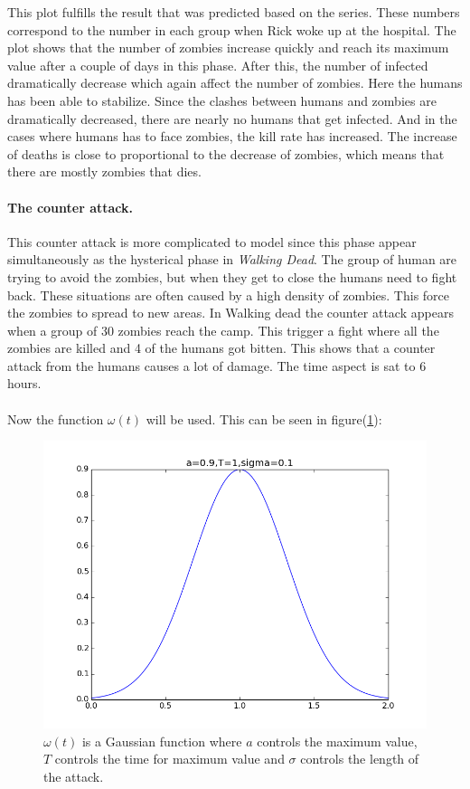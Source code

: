 \documentclass[%
twoside,                 %
final,                   %
10pt]{article}
\begin{document}
This plot fulfills the result that was predicted based on the series. These numbers correspond to the number in each group when Rick woke up at the hospital.  The plot shows that the number of zombies increase quickly and reach its maximum value after a couple of days in this phase. After this, the number of infected dramatically decrease which again affect the number of zombies. Here the humans has been able to stabilize. Since the clashes between humans and zombies are dramatically decreased, there are nearly no humans that get infected. And in the cases where humans has to face zombies, the kill rate has increased. The increase of deaths is close to proportional to the decrease of zombies, which means that there are mostly zombies that dies.

\paragraph{The counter attack.}
This counter attack is more complicated to model since this phase appear simultaneously as the hysterical phase in \emph{Walking Dead}. The group of human are trying to avoid the zombies, but when they get to close the humans need to fight back. These situations are often caused by a high density of zombies. This force the zombies to spread to new areas. In Walking dead the counter attack appears when a group of 30 zombies reach the camp. This trigger a fight where all the zombies are killed and 4 of the humans got bitten. This shows that a counter attack from the humans causes a lot of damage. The time aspect is sat to 6 hours.  
\\
\\
Now the function $\omega(t)$ will be used. This can be seen in figure(\ref{fig:omega_function}):


\begin{figure}[ht]
  \centerline{\includegraphics[width=0.9\linewidth]{plots/omega_function.png}}
  \caption{
  \label{fig:omega_function} $\omega (t)$ is a Gaussian function where $a$ controls the maximum value, $T$ controls the time for maximum value and $\sigma$ controls the length of the attack.
  }
\end{figure}
\end{document}
